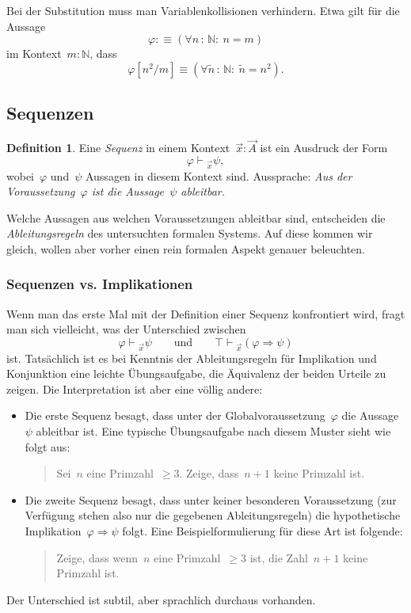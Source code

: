 \documentclass[a4paper,ngerman,12pt]{scrartcl}
\theoremstyle{definition}
\newtheorem{defn}{Definition}[section]
\theoremstyle{plain}
\theoremstyle{remark}
\newcommand{\NN}{\mathbb{N}}
\newcommand{\seq}[1]{\mathrel{\vdash\!\!\!_{#1}}}
\renewcommand{\_}{\mathpunct{.}\,}
\newcommand{\?}{\,{:}\,}
\begin{document}
Bei der Substitution muss man Variablenkollisionen verhindern. Etwa gilt für
die Aussage
\[ \varphi :\equiv (\forall n\?\NN{:}\ n = m) \]
im Kontext~$m : \NN$, dass
\[ \varphi[n^2/m] \equiv (\forall \tilde n\?\NN{:}\ \tilde n = n^2). \]


\subsection{Sequenzen}

\begin{defn}Eine \emph{Sequenz} in einem Kontext~$\vec x : \vec A$ ist ein
Ausdruck der Form
\[ \varphi \seq{\vec x} \psi, \]
wobei~$\varphi$ und~$\psi$ Aussagen in diesem Kontext sind. Aussprache:
\emph{Aus der Voraussetzung~$\varphi$ ist die Aussage~$\psi$ ableitbar.}
\end{defn}

Welche Aussagen aus welchen Voraussetzungen ableitbar sind, entscheiden die
\emph{Ableitungsregeln} des untersuchten formalen Systems. Auf diese kommen wir
gleich, wollen aber vorher einen rein formalen Aspekt genauer beleuchten.


\subsubsection*{Sequenzen vs. Implikationen}

Wenn man das erste Mal mit der Definition einer Sequenz konfrontiert wird,
fragt man sich vielleicht, was der Unterschied zwischen
\[ \text{$\varphi \seq{\vec x} \psi$} \qquad\text{und}\qquad
  \text{$\top \seq{\vec x} (\varphi \Rightarrow \psi)$} \]
ist. Tatsächlich ist es bei Kenntnis der Ableitungsregeln für Implikation und
Konjunktion eine leichte Übungsaufgabe, die Äquivalenz der beiden Urteile zu
zeigen. Die Interpretation ist aber eine völlig andere:
\begin{itemize}
\item Die erste Sequenz besagt, dass unter der Globalvoraussetzung~$\varphi$
die Aussage~$\psi$ ableitbar ist. Eine typische Übungsaufgabe nach diesem
Muster sieht wie folgt aus:
\begin{quote}Sei~$n$ eine Primzahl~$\geq 3$. Zeige, dass~$n + 1$ keine Primzahl
ist.\end{quote}
\item Die zweite Sequenz besagt, dass unter keiner besonderen Voraussetzung
(zur Verfügung stehen also nur die gegebenen Ableitungsregeln) die
hypothetische Implikation~$\varphi \Rightarrow \psi$ folgt. Eine
Beispielformulierung für diese Art ist folgende:
\begin{quote}Zeige, dass wenn~$n$ eine Primzahl~$\geq 3$ ist, die Zahl~$n + 1$
keine Primzahl ist.\end{quote}
\end{itemize}
Der Unterschied ist subtil, aber sprachlich durchaus vorhanden.
\end{document}

